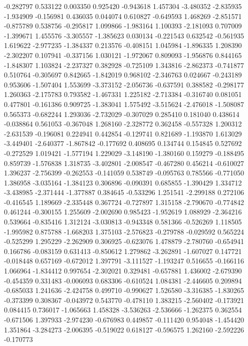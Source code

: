 -0.282797
0.533122
0.003350
0.925420
-0.943618
1.457304
-3.480352
-2.835935
-1.934909
-0.156981
0.436035
0.044074
0.610827
-0.649593
1.468269
-2.851571
-0.875789
0.538756
-0.295817
1.099866
-1.983164
1.100393
-2.181093
0.707009
-1.399671
1.455576
-3.305557
-1.385623
0.030134
-0.221543
0.632542
-0.561935
1.619622
-2.977235
-1.384337
0.213576
-0.408151
1.045984
-1.896335
1.208390
-2.302207
0.107941
-0.337156
1.030121
-1.972067
0.809093
-1.956876
0.844165
-1.848307
1.103824
-2.237327
0.382928
-0.725109
1.343816
-2.862373
-0.741877
0.510764
-0.305697
0.842665
-1.842019
0.968102
-2.346763
0.024667
-0.243189
0.953606
-1.507404
1.553699
-3.373152
-2.056736
-0.637591
0.388582
-0.298177
1.260363
-2.175783
0.793582
-1.467331
1.225182
-2.713384
-0.316740
0.081051
0.477801
-0.161386
0.909725
-1.383041
1.575492
-3.515624
-2.476018
-1.508087
0.565373
-0.682244
1.293036
-2.732029
-0.307029
0.285410
0.181040
0.438614
-0.038864
0.561053
-0.367048
1.268160
-2.328772
0.362458
-0.557328
1.200312
-2.631539
-0.196081
0.224941
0.442854
-0.129741
0.821689
-1.193870
1.613029
-3.449401
-2.640377
-1.867842
-0.177692
0.408695
0.134744
0.154845
0.527692
-0.272529
1.019421
-1.577194
1.229029
-3.148190
-1.380160
0.159279
-0.188495
0.859739
-1.576838
1.318735
-3.402801
-2.008547
-0.467280
0.456214
-0.610027
1.396237
-2.756399
-0.262553
-0.141059
0.538749
-0.095763
0.785566
-0.771050
1.386958
-3.035164
-1.384123
0.306896
-0.090391
0.685855
-1.390429
1.334712
-3.438985
-2.371444
-1.377887
0.384645
-0.533296
1.251541
-2.299188
0.272106
-0.416545
1.189669
-2.335448
0.367724
-0.727897
1.315158
-2.790670
-0.774842
0.461244
-0.300155
1.255609
-2.002690
0.985423
-1.952619
1.088929
-2.364216
0.539664
-0.835416
1.312124
-3.030813
-0.943348
0.581366
-0.526269
1.118505
-1.995982
0.875788
-1.668203
1.375103
-2.576823
-0.279788
-0.029592
0.565224
-0.525299
1.295229
-2.262909
0.306925
-0.623076
1.478879
-2.780760
-0.654941
0.166786
-0.083159
0.631413
-0.850612
1.279862
-3.262891
-1.607027
0.147721
-0.018448
0.657169
-0.672012
1.397791
-3.111527
-1.193247
0.516655
-0.166116
1.066964
-1.834412
0.997654
-2.302021
0.329481
-0.657881
1.436002
-2.679390
-0.454359
0.331483
-0.006093
0.683306
-0.610524
1.084381
-2.446605
0.209894
-0.685033
1.241636
-2.424758
0.499710
-0.990627
1.526580
-3.316385
-1.830265
-0.373399
0.308367
-0.043972
0.543770
-0.478110
1.383215
-2.560402
-0.173921
0.084415
0.736017
-1.065663
1.458328
-3.536263
-2.536666
-1.262375
0.362554
-0.671506
1.397933
-2.974230
-0.676983
0.449857
-0.111420
0.954048
-1.454420
1.351864
-3.284273
-2.006395
-0.519022
0.618127
-0.596575
1.262160
-2.592226
-0.170773
